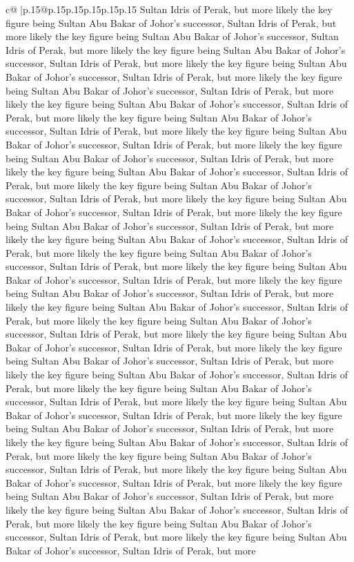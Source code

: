 \documentclass{article}
\begin{document}
{\begin{supertabular}{c@{$\;$}|p{.15\linewidth}@{}p{.15\linewidth}p{.15\linewidth}p{.15\linewidth}p{.15\linewidth}p{.15\linewidth}}
{{{Sultan Idris of Perak, but more likely the key figure being Sultan Abu Bakar of Johor's successor, Sultan Idris of Perak, but more likely the key figure being Sultan Abu Bakar of Johor's successor, Sultan Idris of Perak, but more likely the key figure being Sultan Abu Bakar of Johor's successor, Sultan Idris of Perak, but more likely the key figure being Sultan Abu Bakar of Johor's successor, Sultan Idris of Perak, but more likely the key figure being Sultan Abu Bakar of Johor's successor, Sultan Idris of Perak, but more likely the key figure being Sultan Abu Bakar of Johor's successor, Sultan Idris of Perak, but more likely the key figure being Sultan Abu Bakar of Johor's successor, Sultan Idris of Perak, but more likely the key figure being Sultan Abu Bakar of Johor's successor, Sultan Idris of Perak, but more likely the key figure being Sultan Abu Bakar of Johor's successor, Sultan Idris of Perak, but more likely the key figure being Sultan Abu Bakar of Johor's successor, Sultan Idris of Perak, but more likely the key figure being Sultan Abu Bakar of Johor's successor, Sultan Idris of Perak, but more likely the key figure being Sultan Abu Bakar of Johor's successor, Sultan Idris of Perak, but more likely the key figure being Sultan Abu Bakar of Johor's successor, Sultan Idris of Perak, but more likely the key figure being Sultan Abu Bakar of Johor's successor, Sultan Idris of Perak, but more likely the key figure being Sultan Abu Bakar of Johor's successor, Sultan Idris of Perak, but more likely the key figure being Sultan Abu Bakar of Johor's successor, Sultan Idris of Perak, but more likely the key figure being Sultan Abu Bakar of Johor's successor, Sultan Idris of Perak, but more likely the key figure being Sultan Abu Bakar of Johor's successor, Sultan Idris of Perak, but more likely the key figure being Sultan Abu Bakar of Johor's successor, Sultan Idris of Perak, but more likely the key figure being Sultan Abu Bakar of Johor's successor, Sultan Idris of Perak, but more likely the key figure being Sultan Abu Bakar of Johor's successor, Sultan Idris of Perak, but more likely the key figure being Sultan Abu Bakar of Johor's successor, Sultan Idris of Perak, but more likely the key figure being Sultan Abu Bakar of Johor's successor, Sultan Idris of Perak, but more likely the key figure being Sultan Abu Bakar of Johor's successor, Sultan Idris of Perak, but more likely the key figure being Sultan Abu Bakar of Johor's successor, Sultan Idris of Perak, but more likely the key figure being Sultan Abu Bakar of Johor's successor, Sultan Idris of Perak, but more likely the key figure being Sultan Abu Bakar of Johor's successor, Sultan Idris of Perak, but more likely the key figure being Sultan Abu Bakar of Johor's successor, Sultan Idris of Perak, but more likely the key figure being Sultan Abu Bakar of Johor's successor, Sultan Idris of Perak, but more likely the key figure being Sultan Abu Bakar of Johor's successor, Sultan Idris of Perak, but more likely the key figure being Sultan Abu Bakar of Johor's successor, Sultan Idris of Perak, but more likely the key figure being Sultan Abu Bakar of Johor's successor, Sultan Idris of Perak, but more }}}
\end{supertabular}}
\end{document}
